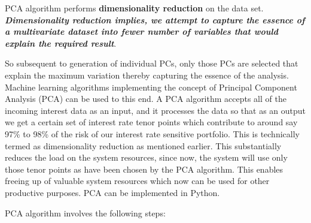 \documentclass[11pt]{article}
\begin{document}
PCA algorithm performs \textbf{dimensionality reduction} on the data
set. \textbf{\emph{Dimensionality reduction implies, we attempt to
capture the essence of a multivariate dataset into fewer number of
variables that would explain the required result}}.

So subsequent to generation of individual PCs, only those PCs are
selected that explain the maximum variation thereby capturing the
essence of the analysis. Machine learning algorithms implementing the
concept of Principal Component Analysis (PCA) can be used to this end. A
PCA algorithm accepts all of the incoming interest data as an input, and
it processes the data so that as an output we get a certain set of
interest rate tenor points which contribute to around say 97\% to 98\%
of the risk of our interest rate sensitive portfolio. This is
technically termed as dimensionality reduction as mentioned earlier.
This substantially reduces the load on the system resources, since now,
the system will use only those tenor points as have been chosen by the
PCA algorithm. This enables freeing up of valuable system resources
which now can be used for other productive purposes. PCA can be
implemented in Python.

PCA algorithm involves the following steps:
\end{document}
